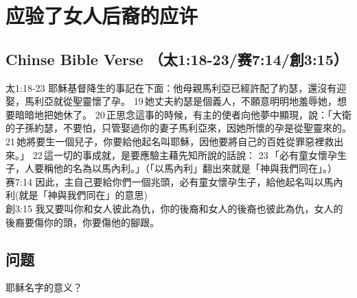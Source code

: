 
\section{应验了女人后裔的应许}




\subsection{Chinse Bible Verse （太1:18-23/赛7:14/創3:15）}
太1:18-23 耶穌基督降生的事記在下面：他母親馬利亞已經許配了約瑟，還沒有迎娶，馬利亞就從聖靈懷了孕。 19 她丈夫約瑟是個義人，不願意明明地羞辱她，想要暗暗地把她休了。 20 正思念這事的時候，有主的使者向他夢中顯現，說：「大衛的子孫約瑟，不要怕，只管娶過你的妻子馬利亞來，因她所懷的孕是從聖靈來的。 21 她將要生一個兒子，你要給他起名叫耶穌，因他要將自己的百姓從罪惡裡救出來。」 22 這一切的事成就，是要應驗主藉先知所說的話說： 23 「必有童女懷孕生子，人要稱他的名為以馬內利。」（「以馬內利」翻出來就是「神與我們同在」。）\\
赛7:14 因此，主自己要給你們一個兆頭，必有童女懷孕生子，給他起名叫以馬內利(就是「神與我們同在」的意思)\\
創3:15 我又要叫你和女人彼此為仇，你的後裔和女人的後裔也彼此為仇，女人的後裔要傷你的頭，你要傷他的腳跟。\\


\subsection{问题}
耶稣名字的意义？



